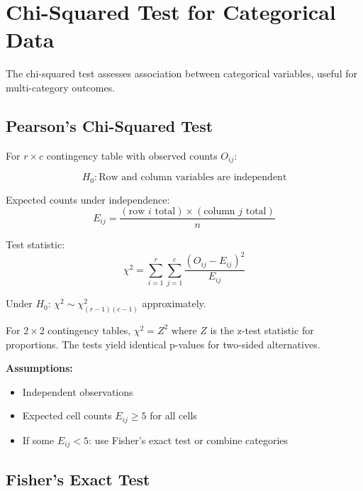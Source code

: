 \section{Chi-Squared Test for Categorical Data}

The chi-squared test assesses association between categorical variables, useful for multi-category outcomes.

\subsection{Pearson's Chi-Squared Test}

For $r \times c$ contingency table with observed counts $O_{ij}$:

\begin{equation}
H_0: \text{Row and column variables are independent}
\end{equation}

Expected counts under independence:
\begin{equation}
E_{ij} = \frac{(\text{row } i \text{ total}) \times (\text{column } j \text{ total})}{n}
\end{equation}

Test statistic:
\begin{equation}
\chi^2 = \sum_{i=1}^r \sum_{j=1}^c \frac{(O_{ij} - E_{ij})^2}{E_{ij}}
\end{equation}

Under $H_0$: $\chi^2 \sim \chi^2_{(r-1)(c-1)}$ approximately.

\begin{proposition}
For $2 \times 2$ contingency tables, $\chi^2 = Z^2$ where $Z$ is the z-test statistic for proportions. The tests yield identical p-values for two-sided alternatives.
\end{proposition}

\textbf{Assumptions:}
\begin{itemize}
    \item Independent observations
    \item Expected cell counts $E_{ij} \geq 5$ for all cells
    \item If some $E_{ij} < 5$: use Fisher's exact test or combine categories
\end{itemize}

\subsection{Fisher's Exact Test}

